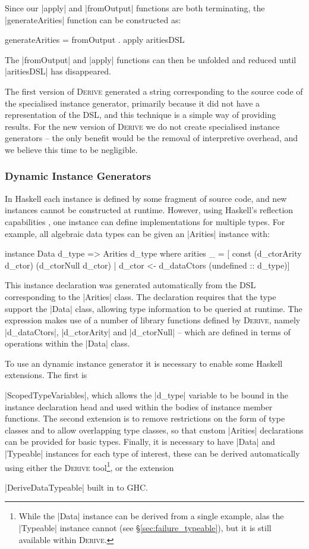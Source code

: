 \documentclass[preprint,draft]{sigplanconf}
\newcommand{\derive}{\textsc{Derive}}
\begin{document}
Since our |apply| and |fromOutput| functions are both terminating, the |generateArities| function can be constructed as:

\begin{code}
generateArities = fromOutput . apply aritiesDSL
\end{code}

The |fromOutput| and |apply| functions can then be unfolded and reduced until |aritiesDSL| has disappeared.

The first version of \derive{} generated a string corresponding to the source code of the specialised instance generator, primarily because it did not have a representation of the DSL, and this technique is a simple way of providing results. For the new version of \derive{} we do not create specialised instance generators -- the only benefit would be the removal of interpretive overhead, and we believe this time to be negligible.

\subsubsection{Dynamic Instance Generators}

In Haskell each instance is defined by some fragment of source code, and new instances cannot be constructed at runtime. However, using Haskell's reflection capabilities \cite{lammel:syb2}, one instance can define implementations for multiple types. For example, all algebraic data types can be given an |Arities| instance with:

\begin{code}
instance Data d_type => Arities d_type where
    arities _ =  [  const (d_ctorArity d_ctor) (d_ctorNull d_ctor)
                 |  d_ctor <- d_dataCtors (undefined :: d_type)]
\end{code}

This instance declaration was generated automatically from the DSL corresponding to the |Arities| class. The declaration requires that the type support the |Data| class, allowing type information to be queried at runtime. The expression makes use of a number of library functions defined by \derive{}, namely |d_dataCtors|, |d_ctorArity| and |d_ctorNull| -- which are defined in terms of operations within the |Data| class.

To use an dynamic instance generator it is necessary to enable some Haskell extensions. The first is \ignore|ScopedTypeVariables|, which allows the |d_type| variable to be bound in the instance declaration head and used within the bodies of instance member functions. The second extension is to remove restrictions on the form of type classes and to allow overlapping type classes, so that custom |Arities| declarations can be provided for basic types. Finally, it is necessary to have |Data| and |Typeable| instances for each type of interest, these can be derived automatically using either the \derive{} tool\footnote{While the |Data| instance can be derived from a single example, alas the |Typeable| instance cannot (see \S\ref{sec:failure_typeable}), but it is still available within \derive{}.}, or the extension \ignore|DeriveDataTypeable| built in to GHC.
\end{document}
